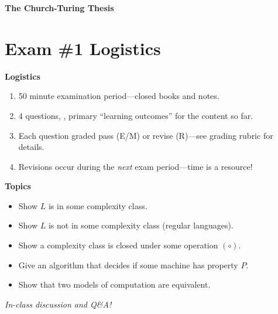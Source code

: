\documentclass[11pt]{book}
\newcommand{\doctitle}{The Church-Turing Thesis}
\begin{document}
\begin{center}
  \large\textbf{{\doctitle}}
\end{center}

\vspace{2em}


\section*{Exam \#1 Logistics}

\noindent\textbf{Logistics}
\begin{enumerate}
  \item 50 minute examination period---closed books and notes.
  \item 4 questions, \ie, primary ``learning outcomes'' for the content so far.
  \item Each question graded pass (E/M) or revise (R)---see grading rubric for details.
  \item Revisions occur during the \emph{next} exam period---time is a resource!
\end{enumerate}

\noindent\textbf{Topics}
\begin{itemize}
  \item Show \( L \) is in some complexity class.
  \item Show \( L \) is not in some complexity class (regular languages).
  \item Show a complexity class is closed under some operation \( (∘) \).
  \item Give an algorithm that decides if some machine has property \( P \).
  \item Show that two models of computation are equivalent.
\end{itemize}

\vspace{2ex}

\mbox{}
\vfill
\noindent\emph{In-class discussion and Q\&A!}
\end{document}
